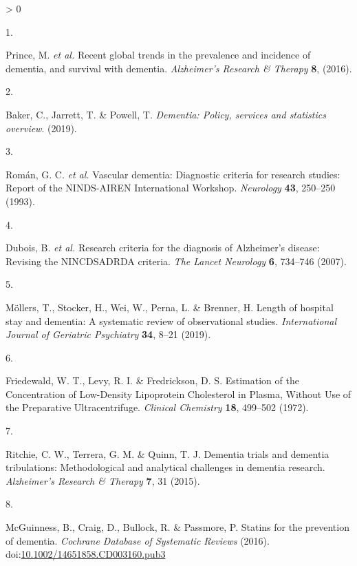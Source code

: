 \documentclass[a4paper, twoside]{templates/ociamthesis}
\newlength{\cslhangindent}
\newlength{\csllabelwidth}
\newenvironment{CSLReferences}[3] %
 {%
  \setlength{\parindent}{0pt}
  \ifodd #1 \everypar{\setlength{\hangindent}{\cslhangindent}}\ignorespaces\fi
  \ifnum #2 > 0
  \setlength{\parskip}{#2\baselineskip}
  \fi
 }%
 {}
\newcommand{\CSLLeftMargin}[1]{\parbox[t]{\maxof{\widthof{#1}}{\csllabelwidth}}{#1}}
\newcommand{\CSLRightInline}[1]{\parbox[t]{\linewidth - \csllabelwidth}{#1}}
\begin{document}
\hypertarget{refs}{}
\begin{CSLReferences}{0}{0}
\leavevmode\hypertarget{ref-prince2016}{}%
\CSLLeftMargin{1. }
\CSLRightInline{Prince, M. \emph{et al.} Recent global trends in the prevalence and incidence of dementia, and survival with dementia. \emph{Alzheimer's Research \& Therapy} \textbf{8}, (2016).}

\leavevmode\hypertarget{ref-baker2019}{}%
\CSLLeftMargin{2. }
\CSLRightInline{Baker, C., Jarrett, T. \& Powell, T. \emph{Dementia: Policy, services and statistics overview}. (2019).}

\leavevmode\hypertarget{ref-roman1993vascular}{}%
\CSLLeftMargin{3. }
\CSLRightInline{Román, G. C. \emph{et al.} Vascular dementia: Diagnostic criteria for research studies: Report of the {NINDS}-{AIREN International Workshop}. \emph{Neurology} \textbf{43}, 250--250 (1993).}

\leavevmode\hypertarget{ref-dubois2007}{}%
\CSLLeftMargin{4. }
\CSLRightInline{Dubois, B. \emph{et al.} Research criteria for the diagnosis of {Alzheimer}'s disease: Revising the {NINCDS}{{ADRDA}} criteria. \emph{The Lancet Neurology} \textbf{6}, 734--746 (2007).}

\leavevmode\hypertarget{ref-mollers2019}{}%
\CSLLeftMargin{5. }
\CSLRightInline{Möllers, T., Stocker, H., Wei, W., Perna, L. \& Brenner, H. Length of hospital stay and dementia: {A} systematic review of observational studies. \emph{International Journal of Geriatric Psychiatry} \textbf{34}, 8--21 (2019).}

\leavevmode\hypertarget{ref-friedewald1972}{}%
\CSLLeftMargin{6. }
\CSLRightInline{Friedewald, W. T., Levy, R. I. \& Fredrickson, D. S. Estimation of the {Concentration} of {Low}-{Density Lipoprotein Cholesterol} in {Plasma}, {Without Use} of the {Preparative Ultracentrifuge}. \emph{Clinical Chemistry} \textbf{18}, 499--502 (1972).}

\leavevmode\hypertarget{ref-ritchie2015}{}%
\CSLLeftMargin{7. }
\CSLRightInline{Ritchie, C. W., Terrera, G. M. \& Quinn, T. J. Dementia trials and dementia tribulations: Methodological and analytical challenges in dementia research. \emph{Alzheimer's Research \& Therapy} \textbf{7}, 31 (2015).}

\leavevmode\hypertarget{ref-mcguinness2016a}{}%
\CSLLeftMargin{8. }
\CSLRightInline{McGuinness, B., Craig, D., Bullock, R. \& Passmore, P. Statins for the prevention of dementia. \emph{Cochrane Database of Systematic Reviews} (2016). doi:\href{https://doi.org/10.1002/14651858.CD003160.pub3}{10.1002/14651858.CD003160.pub3}}


\end{CSLReferences}
\end{document}
